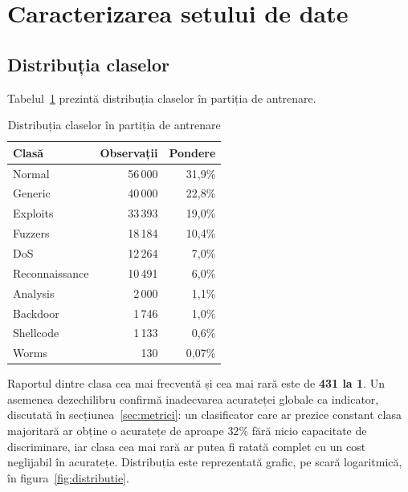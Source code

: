 \section{Caracterizarea setului de date}\label{sec:caracterizare}

\subsection{Distribuția claselor}\label{subsec:distributie}

Tabelul~\ref{tab:distributie} prezintă distribuția claselor în partiția de antrenare.

\begin{table}[!ht]
    \caption{Distribuția claselor în partiția de antrenare}
    \centering
    \begin{tabular}{|l|r|r|}
        \hline
        \textbf{Clasă} & \textbf{Observații} & \textbf{Pondere} \\
        \hline
        Normal & 56\,000 & 31,9\% \\
        \hline
        Generic & 40\,000 & 22,8\% \\
        \hline
        Exploits & 33\,393 & 19,0\% \\
        \hline
        Fuzzers & 18\,184 & 10,4\% \\
        \hline
        DoS & 12\,264 & 7,0\% \\
        \hline
        Reconnaissance & 10\,491 & 6,0\% \\
        \hline
        Analysis & 2\,000 & 1,1\% \\
        \hline
        Backdoor & 1\,746 & 1,0\% \\
        \hline
        Shellcode & 1\,133 & 0,6\% \\
        \hline
        Worms & 130 & 0,07\% \\
        \hline
    \end{tabular}
    \label{tab:distributie}
\end{table}

Raportul dintre clasa cea mai frecventă și cea mai rară este de \textbf{431 la 1}. Un asemenea dezechilibru confirmă inadecvarea acurateței globale ca indicator, discutată în secțiunea~\ref{sec:metrici}: un clasificator care ar prezice constant clasa majoritară ar obține o acuratețe de aproape $32\%$ fără nicio capacitate de discriminare, iar clasa cea mai rară ar putea fi ratată complet cu un cost neglijabil în acuratețe. Distribuția este reprezentată grafic, pe scară logaritmică, în figura~\ref{fig:distributie}.

